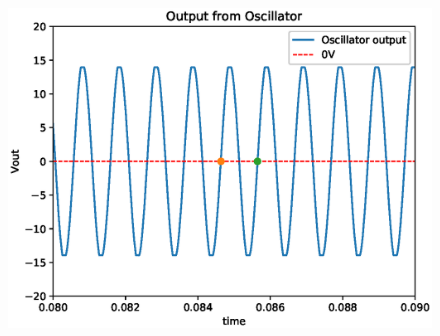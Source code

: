 \begin{enumerate}[label=\thesubsection.\arabic*.,ref=\thesubsection.\theenumi]
 
 \begin{figure}[!ht]
\centering
\includegraphics[width=\columnwidth]{./figs/ee18btech11044/ee18btech11044_3_3.eps}
\caption{}
\label{fig:ee18btech11044_3_plot_3}
\end{figure}
\end{enumerate}
